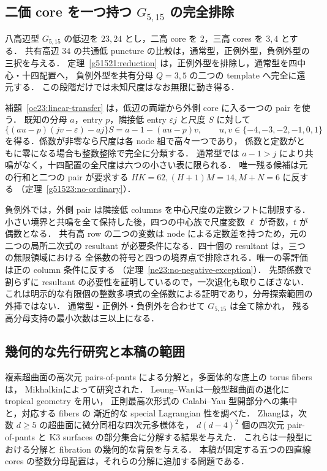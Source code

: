 \subsection{二価 core を一つ持つ \texorpdfstring{$G_{5,15}$}{G5,15} の完全排除}

八高辺型 $G_{5,15}$ の低辺を $23,24$ とし，二高 core を $2$，三高 cores を $3,4$ とする．
共有高辺 $34$ の共通低 puncture の比較は，通常型，正例外型，負例外型の三択を与える．
定理~\ref{g51521:reduction} は，正例外型を排除し，通常型を四中心・十四配置へ，
負例外型を共有分母 $Q=3,5$ の二つの template へ完全に還元する．
この段階だけでは未知尺度はなお無限に動き得る．

補題~\ref{oc23:linear-transfer} は，低辺の両端から外側 core に入る一つの pair を使う．
既知の分母 $a$，entry $p$，隣接低 entry $\varepsilon j$ と尺度 $S$ に対して
\[
 \{(au-p)(jv-\varepsilon)-aj\}S=a-1-(au-p)v,
 \qquad u,v\in\{-4,-3,-2,-1,0,1\}
\]
を得る．係数が非零なら尺度は各 node 組で高々一つであり，
係数と定数がともに零になる場合も整数整除で完全に分類する．
通常型では $a-1>j$ により共鳴がなく，十四配置の全尺度は六つの小さい表に限られる．
唯一残る候補は元の行和と二つの pair が要求する
$HK=62,(H+1)M=14,M+N=6$ に反する
（定理~\ref{g51523:no-ordinary}）．

負例外では，外側 pair は隣接低 columns を中心尺度の定数シフトに制限する．
小さい境界と共鳴を全て保持した後，四つの中心族で尺度変数 $\ell$ が奇数，$t$ が偶数となる．
共有高 row の二つの変数は node による定数差を持つため，元の二つの局所二次式の
resultant が必要条件になる．四十個の resultant は，三つの無限領域における
全係数の符号と四つの境界点で排除される．唯一の零評価は正の column 条件に反する
（定理~\ref{ne23:no-negative-exception}）．
先頭係数で割らずに resultant の必要性を証明しているので，一次退化も取りこぼさない．
これは明示的な有限個の整数多項式の全係数による証明であり，分母探索範囲の外挿ではない．
通常型・正例外・負例外を合わせて $G_{5,15}$ は全て除かれ，
残る高分母支持の最小次数は三以上になる．

\subsection{幾何的な先行研究と本稿の範囲}

複素超曲面の高次元 pairs-of-pants による分解と，多面体的な底上の torus fibers は，
Mikhalkin\cite[Theorems~1 and~1$'$]{Mikhalkin}によって研究された．
Leung--Wan\cite{LeungWan}は一般型超曲面の退化に tropical geometry を用い，
正則最高次形式の Calabi--Yau 型開部分への集中と，対応する fibers の
漸近的な special Lagrangian 性を調べた．
Zhang\cite[Theorem~1.1]{Zhang}は，次数 $d\ge5$ の超曲面に微分同相な四次元多様体を，
$d(d-4)^2$ 個の四次元 pair-of-pants と K3 surfaces の部分集合に分解する結果を与えた．
これらは一般型における分解と fibration の幾何的な背景を与える．
本稿が固定する五つの四直線 cores の整数分母配置は，それらの分解に追加する問題である．

